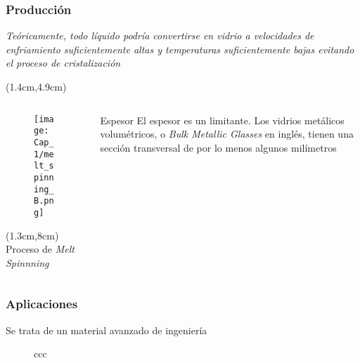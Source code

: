 \begin{frame}
 \frametitle{Producci\'on}
 \vspace{-0.15cm}
 \begin{block}{}
    \textit{Te\'oricamente, todo l\'iquido podr\'ia convertirse en vidrio a velocidades de enfriamiento suficientemente altas y temperaturas suficientemente bajas evitando el proceso de cristalizaci\'on} \cite{turnbull61}
 \end{block}
 
 \begin{textblock*}{10cm}(1.4cm,4.9cm)
  \begin{columns}
    \begin{column}{4cm}
      \begin{figure}
	\texttt{[image: Cap\_1/melt\_spinning\_B.png]}
      \end{figure} 
      \begin{textblock*}{4cm}(1.3cm,8cm)
	\scriptsize{Proceso de \textit{Melt Spinnning}}
      \end{textblock*}
    \end{column}
    \begin{column}{6cm}
    \begin{alertblock}{Espesor}
	El espesor es un limitante. Los vidrios met\'alicos volum\'etricos, o \textit{Bulk Metallic Glasses} en ingl\'es, tienen una secci\'on transversal de por lo menos algunos mil\'imetros
    \end{alertblock}
    \end{column}
  \end{columns}
 \end{textblock*}
 
\end{frame}


\begin{frame}
 \frametitle{Aplicaciones}
 \centering
 Se trata de un material avanzado de ingenier\'ia
 
 
 \begin{figure}
 \centering
 \begin{tabularx}{\textwidth}{ccc}
 \end{tabularx}
\end{figure}
\end{frame}

